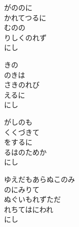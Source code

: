 \documentclass[10pt,b5j]{tarticle} %
\begin{document}
\vspace{1.5em} %
\newcommand{\linespace}{0.5em} %
\newcommand{\blocksize}{0.5\hsize} %
\begin{enumerate} %
    \begin{minipage}[c]{\blocksize}
    
        \vspace{\linespace}
        \item
        がののに\\
        かれてつるに\\
        むのの\\
        りしくのれず\\
        にし
        
        \vspace{\linespace}
        \item
        きの\\
        のきは\\
        さきのれび\\
        えるに\\
        にし
        
        \vspace{\linespace}
        \item
        がしのも\\
        くくづきて\\
        をするに\\
        るはのためか\\
        にし
        
        \vspace{\linespace}
        \item
        ゆえだもあらぬこのみ\\
        のにみりて\\
        ぬぐいもれずただ\\
        れちてはにわれ\\
        にし
    
    \end{minipage}
\end{enumerate} %
\end{document}
